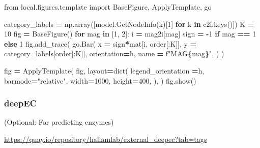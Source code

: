 \documentclass[
]{book}
\newenvironment{Shaded}{\begin{snugshade}}{\end{snugshade}}
\newcommand{\BuiltInTok}[1]{#1}
\newcommand{\ControlFlowTok}[1]{\textcolor[rgb]{0.13,0.29,0.53}{\textbf{#1}}}
\newcommand{\DecValTok}[1]{\textcolor[rgb]{0.00,0.00,0.81}{#1}}
\newcommand{\ImportTok}[1]{#1}
\newcommand{\KeywordTok}[1]{\textcolor[rgb]{0.13,0.29,0.53}{\textbf{#1}}}
\newcommand{\NormalTok}[1]{#1}
\newcommand{\OperatorTok}[1]{\textcolor[rgb]{0.81,0.36,0.00}{\textbf{#1}}}
\newcommand{\SpecialCharTok}[1]{\textcolor[rgb]{0.81,0.36,0.00}{\textbf{#1}}}
\newcommand{\SpecialStringTok}[1]{\textcolor[rgb]{0.31,0.60,0.02}{#1}}
\newcommand{\StringTok}[1]{\textcolor[rgb]{0.31,0.60,0.02}{#1}}
\begin{document}
\begin{Shaded}
\begin{Highlighting}[numbers=left,,]
\ImportTok{from}\NormalTok{ local.figures.template }\ImportTok{import}\NormalTok{ BaseFigure, ApplyTemplate, go}

\NormalTok{category\_labels }\OperatorTok{=}\NormalTok{ np.array([model.GetNodeInfo(k)[}\DecValTok{1}\NormalTok{] }\ControlFlowTok{for}\NormalTok{ k }\KeywordTok{in}\NormalTok{ c2i.keys()])}
\NormalTok{K }\OperatorTok{=} \DecValTok{10}
\NormalTok{fig }\OperatorTok{=}\NormalTok{ BaseFigure()}
\ControlFlowTok{for}\NormalTok{ mag }\KeywordTok{in}\NormalTok{ [}\DecValTok{1}\NormalTok{, }\DecValTok{2}\NormalTok{]:}
\NormalTok{    i }\OperatorTok{=}\NormalTok{ mag2i[mag]}
\NormalTok{    sign }\OperatorTok{=} \OperatorTok{{-}}\DecValTok{1} \ControlFlowTok{if}\NormalTok{ mag }\OperatorTok{==} \DecValTok{1} \ControlFlowTok{else} \DecValTok{1}
\NormalTok{    fig.add\_trace(}
\NormalTok{        go.Bar(}
\NormalTok{            x }\OperatorTok{=}\NormalTok{ sign}\OperatorTok{*}\NormalTok{mat[i, order[:K]],}
\NormalTok{            y }\OperatorTok{=}\NormalTok{ category\_labels[order[:K]],}
\NormalTok{            orientation}\OperatorTok{=}\StringTok{\textquotesingle{}h\textquotesingle{}}\NormalTok{,}
\NormalTok{            name }\OperatorTok{=} \SpecialStringTok{f"MAG}\SpecialCharTok{\{}\NormalTok{mag}\SpecialCharTok{\}}\SpecialStringTok{"}\NormalTok{,}
\NormalTok{        )}
\NormalTok{    )}

\NormalTok{fig }\OperatorTok{=}\NormalTok{ ApplyTemplate(}
\NormalTok{    fig,}
\NormalTok{    layout}\OperatorTok{=}\BuiltInTok{dict}\NormalTok{(}
\NormalTok{        legend\_orientation }\OperatorTok{=}\StringTok{\textquotesingle{}h\textquotesingle{}}\NormalTok{,}
\NormalTok{        barmode}\OperatorTok{=}\StringTok{"relative"}\NormalTok{,}
\NormalTok{        width}\OperatorTok{=}\DecValTok{1000}\NormalTok{, height}\OperatorTok{=}\DecValTok{400}\NormalTok{,}
\NormalTok{    ),}
\NormalTok{)}
\NormalTok{fig.show()}
\end{Highlighting}
\end{Shaded}

\subsubsection{deepEC}\label{deepec}

(Optional: For predicting enzymes)

\url{https://quay.io/repository/hallamlab/external_deepec?tab=tags}
\end{document}
